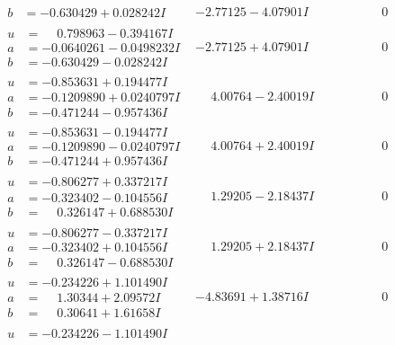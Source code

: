 \documentclass[1p]{elsarticle_modified}
\theoremstyle{definition}
\begin{document}
$$\begin{array}{c|c|c}
\begin{aligned}
b &= -0.630429 + 0.028242 I\end{aligned}
 & -2.77125 - 4.07901 I & \phantom{-0.000000 } 0 \\ \hline\begin{aligned}
u &= \phantom{-}0.798963 - 0.394167 I \\
a &= -0.0640261 - 0.0498232 I \\
b &= -0.630429 - 0.028242 I\end{aligned}
 & -2.77125 + 4.07901 I & \phantom{-0.000000 } 0 \\ \hline\begin{aligned}
u &= -0.853631 + 0.194477 I \\
a &= -0.1209890 + 0.0240797 I \\
b &= -0.471244 - 0.957436 I\end{aligned}
 & \phantom{-}4.00764 - 2.40019 I & \phantom{-0.000000 } 0 \\ \hline\begin{aligned}
u &= -0.853631 - 0.194477 I \\
a &= -0.1209890 - 0.0240797 I \\
b &= -0.471244 + 0.957436 I\end{aligned}
 & \phantom{-}4.00764 + 2.40019 I & \phantom{-0.000000 } 0 \\ \hline\begin{aligned}
u &= -0.806277 + 0.337217 I \\
a &= -0.323402 - 0.104556 I \\
b &= \phantom{-}0.326147 + 0.688530 I\end{aligned}
 & \phantom{-}1.29205 - 2.18437 I & \phantom{-0.000000 } 0 \\ \hline\begin{aligned}
u &= -0.806277 - 0.337217 I \\
a &= -0.323402 + 0.104556 I \\
b &= \phantom{-}0.326147 - 0.688530 I\end{aligned}
 & \phantom{-}1.29205 + 2.18437 I & \phantom{-0.000000 } 0 \\ \hline\begin{aligned}
u &= -0.234226 + 1.101490 I \\
a &= \phantom{-}1.30344 + 2.09572 I \\
b &= \phantom{-}0.30641 + 1.61658 I\end{aligned}
 & -4.83691 + 1.38716 I & \phantom{-0.000000 } 0 \\ \hline\begin{aligned}
u &= -0.234226 - 1.101490 I \\

\end{aligned}
\end{array}$$
\end{document}

